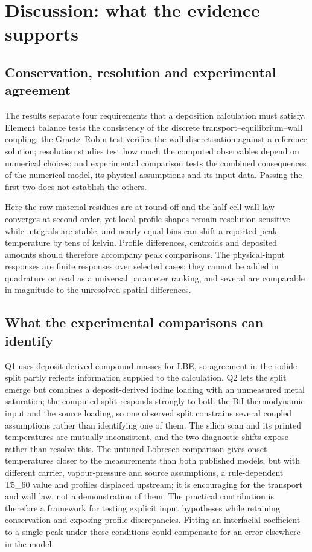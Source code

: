 \section{Discussion: what the evidence supports}
\label{sec:discussion}
\subsection{Conservation, resolution and experimental agreement}
The results separate four requirements that a deposition calculation
must satisfy. Element balance tests the consistency of the discrete
transport--equilibrium--wall coupling; the Graetz--Robin test verifies
the wall discretisation against a reference solution; resolution
studies test how much the computed observables depend on numerical
choices; and experimental comparison tests the combined consequences of
the numerical model, its physical assumptions and its input data.
Passing the first two does not establish the others.

Here the raw material residues are at round-off and the half-cell wall
law converges at second order, yet local profile shapes remain
resolution-sensitive while integrals are stable, and nearly equal bins
can shift a reported peak temperature by tens of kelvin. Profile
differences, centroids and deposited amounts should therefore accompany
peak comparisons. The physical-input responses are finite responses over
selected cases; they cannot be added in quadrature or read as a
universal parameter ranking, and several are comparable in magnitude to
the unresolved spatial differences.

\subsection{What the experimental comparisons can identify}
Q1 uses deposit-derived compound masses for LBE, so agreement in the
iodide split partly reflects information supplied to the calculation.
Q2 lets the split emerge but combines a deposit-derived iodine loading
with an unmeasured metal saturation; the computed split responds
strongly to both the BiI thermodynamic input and the source loading, so
one observed split constrains several coupled assumptions rather than
identifying one of them. The silica scan and its printed temperatures are
mutually inconsistent, and the two diagnostic shifts expose rather than
resolve this. The untuned Lobresco comparison gives onset temperatures
closer to the measurements than both published models, but with
different carrier, vapour-pressure and source assumptions, a
rule-dependent T5\_60 value and profiles displaced upstream; it is
encouraging for the transport and wall law, not a demonstration of
them. The practical contribution is therefore a framework for testing
explicit input hypotheses while retaining conservation and exposing
profile discrepancies. Fitting an interfacial coefficient to a single
peak under these conditions could compensate for an error elsewhere in
the model.

